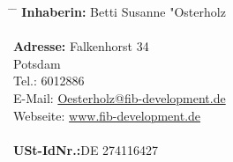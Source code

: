 \documentclass[12pt,a4paper]{article}
\begin{document}
\begin{tabbing}
\hspace{35mm}\=\hspace{20mm} \=\kill
\textbf{Inhaberin:} \> Betti Susanne "Osterholz \>\\
 \> \>\\
\textbf{Adresse:}\> Falkenhorst 34 \>\\
	  Potsdam \>\\
	\>Tel.:  6012886\\
	\>E-Mail: \>\url{Oesterholz@fib-development.de}\\
	\>Webseite: \>\url{www.fib-development.de}\\
 \> \>\\
\textbf{USt-IdNr.:}\>DE 274116427 \>\\
\end{tabbing}
\end{document}
